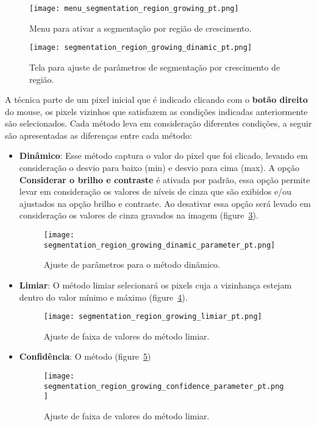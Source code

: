 \begin{figure}[!htb]
\centering
\texttt{[image: menu\_segmentation\_region\_growing\_pt.png]}
\caption{Menu para ativar a segmentação por região de crescimento.}
\label{fig:menu_segmentation_region_growing}
\end{figure}

\begin{figure}[!htb]
\centering
\texttt{[image: segmentation\_region\_growing\_dinamic\_pt.png]}
\caption{Tela para ajuste de parâmetros de segmentação por crescimento de região.}
\label{fig:segmentation_region_growing_dinamic}
\end{figure}

A técnica parte de um pixel inicial que é indicado clicando com o \textbf{botão direito} do mouse, os pixels vizinhos que satisfazem as condições indicadas anteriormente são selecionados. Cada método leva em consideração diferentes condições, a seguir são apresentadas as diferenças entre cada método:

\begin{itemize}
	\item \textbf{Dinâmico}: Esse método captura o valor do pixel que foi clicado, levando em consideração o desvio para baixo (min) e desvio para cima (max). A opção \textbf{Considerar o brilho e contraste} é ativada por padrão, essa opção permite levar em consideração os valores de níveis de cinza que são exibidos e/ou ajustados na opção brilho e contraste. Ao desativar essa opção será levado em consideração os valores de cinza gravados na imagem (figure~\ref{fig:segmentation_region_growing_dinamic_parameter}). 
	
	\begin{figure}[!htb]
	\centering
	\texttt{[image: segmentation\_region\_growing\_dinamic\_parameter\_pt.png]}
	\caption{Ajuste de parâmetros para o método dinâmico.}
	\label{fig:segmentation_region_growing_dinamic_parameter}
	\end{figure}
	
	\item \textbf{Limiar}: O método limiar selecionará os pixels cuja a vizinhança estejam dentro do valor mínimo e máximo (figure~\ref{fig:segmentation_region_growing_limiar}).

	\begin{figure}[!htb]
	\centering
	\texttt{[image: segmentation\_region\_growing\_limiar\_pt.png]}
	\caption{Ajuste de faixa de valores do método limiar.}
	\label{fig:segmentation_region_growing_limiar}
	\end{figure}	
	
	\item \textbf{Confidência}: O método (figure~\ref{fig:segmentation_region_growing_confidence_parameter})
	
	\begin{figure}[!htb]
	\centering
	\texttt{[image: segmentation\_region\_growing\_confidence\_parameter\_pt.png]}
	\caption{Ajuste de faixa de valores do método limiar.}
	\label{fig:segmentation_region_growing_confidence_parameter}
	\end{figure}	
	
	
\end{itemize}
